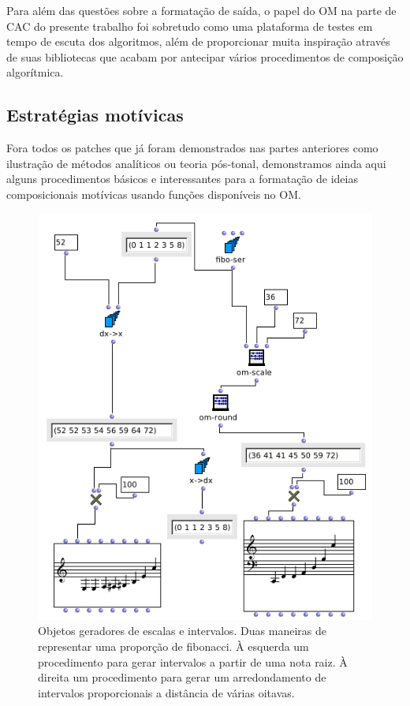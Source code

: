 \documentclass[
	12pt,				%
	openright,			%
	twoside,			%
	a4paper,			%
	english,			%
	french,				%
	spanish,			%
	brazil				%
	]{abntex2}
\begin{document}
Para além das questões sobre a formatação de saída, o papel do OM na parte de CAC do presente 
trabalho foi sobretudo como uma plataforma de testes em tempo de escuta dos algoritmos, além de proporcionar muita inspiração através de suas bibliotecas que acabam por antecipar vários procedimentos de composição algorítmica.


\subsection{Estratégias motívicas}

Fora todos os patches que já foram demonstrados nas partes anteriores como ilustração de métodos analíticos ou teoria pós-tonal, demonstramos ainda aqui alguns procedimentos básicos e interessantes para a formatação de ideias composicionais motívicas usando funções disponíveis no OM.


\begin{figure}[!h]
	\caption{\label{fig_grafico}Objetos geradores de escalas e intervalos. Duas maneiras de representar uma proporção de fibonacci. À esquerda um procedimento para gerar intervalos a partir de uma nota raiz. À direita um procedimento para gerar um arredondamento de intervalos proporcionais a distância de várias oitavas. }
	\begin{center}
	    \includegraphics[scale=0.6]{OM_settheory/fibonacci.png}
	\end{center}
\end{figure}
\end{document}
